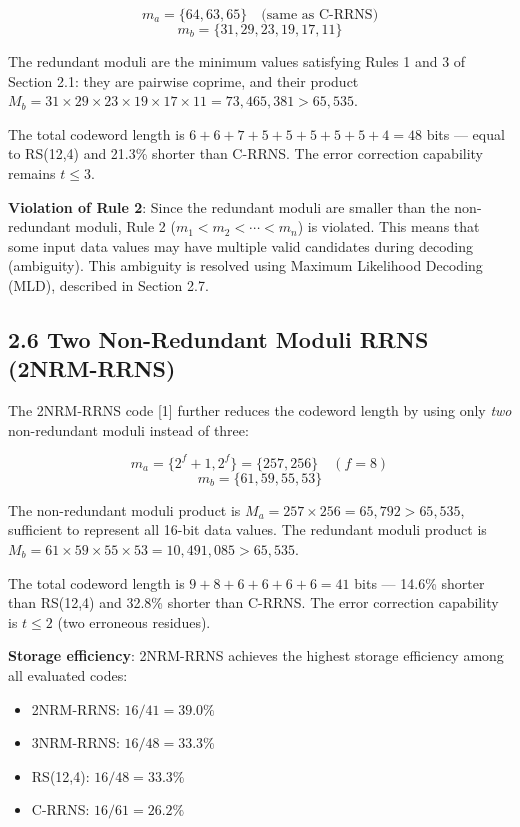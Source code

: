\[m_a = \{64, 63, 65\} \quad \text{(same as C-RRNS)}\]
\[m_b = \{31, 29, 23, 19, 17, 11\}\]

The redundant moduli are the minimum values satisfying Rules 1 and 3 of
Section 2.1: they are pairwise coprime, and their product
\(M_b = 31 \times 29 \times 23 \times 19 \times 17 \times 11 = 73{,}465{,}381 > 65{,}535\).

The total codeword length is \(6 + 6 + 7 + 5 + 5 + 5 + 5 + 5 + 4 = 48\)
bits --- equal to RS(12,4) and 21.3\% shorter than C-RRNS. The error
correction capability remains \(t \leq 3\).

\textbf{Violation of Rule 2}: Since the redundant moduli are smaller
than the non-redundant moduli, Rule 2 (\(m_1 < m_2 < \cdots < m_n\)) is
violated. This means that some input data values may have multiple valid
candidates during decoding (ambiguity). This ambiguity is resolved using
Maximum Likelihood Decoding (MLD), described in Section 2.7.

\subsection{2.6 Two Non-Redundant Moduli RRNS
(2NRM-RRNS)}\label{two-non-redundant-moduli-rrns-2nrm-rrns}

The 2NRM-RRNS code {[}1{]} further reduces the codeword length by using
only \emph{two} non-redundant moduli instead of three:

\[m_a = \{2^f + 1, 2^f\} = \{257, 256\} \quad (f = 8)\]
\[m_b = \{61, 59, 55, 53\}\]

The non-redundant moduli product is
\(M_a = 257 \times 256 = 65{,}792 > 65{,}535\), sufficient to represent
all 16-bit data values. The redundant moduli product is
\(M_b = 61 \times 59 \times 55 \times 53 = 10{,}491{,}085 > 65{,}535\).

The total codeword length is \(9 + 8 + 6 + 6 + 6 + 6 = 41\) bits ---
14.6\% shorter than RS(12,4) and 32.8\% shorter than C-RRNS. The error
correction capability is \(t \leq 2\) (two erroneous residues).

\textbf{Storage efficiency}: 2NRM-RRNS achieves the highest storage
efficiency among all evaluated codes:

\begin{itemize}
\tightlist
\item
  2NRM-RRNS: \(16/41 = 39.0\%\)
\item
  3NRM-RRNS: \(16/48 = 33.3\%\)
\item
  RS(12,4): \(16/48 = 33.3\%\)
\item
  C-RRNS: \(16/61 = 26.2\%\)
\end{itemize}

